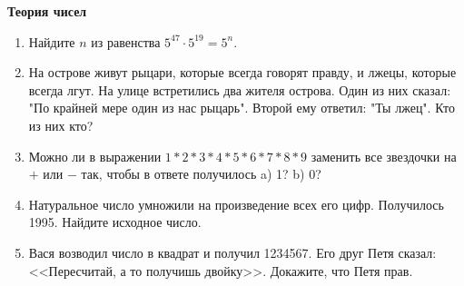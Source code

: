 \documentclass{article}
\begin{document}
\large
	
\begin{center}
	\textbf{Теория чисел}
\end{center}


\begin{enumerate}[label*=\protect\fbox{\arabic{enumi}}]
	
\item Найдите $n$ из равенства $5^{47} \cdot 5^{19} = 5^n$.

\item На острове живут рыцари, которые всегда говорят правду, и лжецы, которые всегда лгут. На улице встретились два жителя острова. Один из них сказал: "По крайней мере один из нас рыцарь". Второй ему ответил: "Ты лжец". Кто из них кто?

\item Можно ли в выражении $1 * 2 * 3*4*5*6*7*8*9$ заменить все звездочки на $+$ или $-$ так, чтобы в ответе получилось a) 1? b) 0?

\item Натуральное число умножили на произведение всех его цифр. Получилось 1995. Найдите исходное
число.

\item Вася возводил число в квадрат и получил 1234567. Его друг Петя сказал: <<Пересчитай, а то получишь двойку>>. Докажите, что Петя прав.


\end{enumerate}
\end{document}
